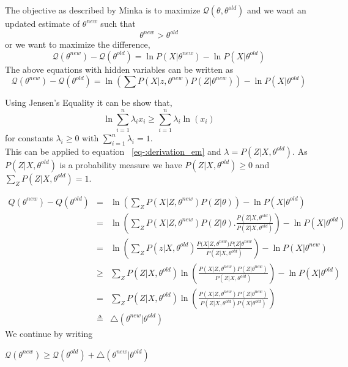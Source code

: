\documentclass[12pt]{dalcsthesis}
\begin{document}
The objective as described by Minka \cite{minka1998expectation} is to maximize $\mathcal{Q}(\theta,\theta^{old})$ and we want an updated estimate of $\theta^{new}$ such that 
\begin{equation}
\theta^{new}>\theta^{old}
\end{equation}
or we want to maximize the difference,
\begin{equation}
\mathcal{Q}(\theta^{new})-\mathcal{Q}(\theta^{old})=\ln P(X|\theta^{new}) - \ln P(X|\theta^{old})
\end{equation}
The above equations with hidden variables can be written as
\begin{equation}
\label{eq-:derivation_em}
\mathcal{Q}(\theta^{new})-\mathcal{Q}(\theta^{old})=\ln(\sum P(X|z,\theta^{new}) P(Z|\theta^{new})) - \ln P(X|\theta^{old})
\end{equation}

Using Jensen's Equality it can be show that,
\begin{equation}
\ln \sum_{i=1}^{n}\lambda_{i}x_{i} \geq \sum_{i=1}^{n}\lambda_{i}\ln(x_{i})
\end{equation}
for constants $\lambda_{i} \geq 0$ with $\sum_{i=1}^{n}\lambda_{i}=1$. 
\\
This can be applied to equation ~\ref{eq-:derivation_em} and $\lambda=P(Z|X,\theta^{old})$. As $P(Z|X,\theta^{old})$ is a probability measure we have $P(Z|X,\theta^{old}) \geq 0$ and $\sum_{Z}P(Z|X,\theta^{old})=1$.

\begin{eqnarray}
Q(\theta^{new})-Q(\theta^{old}) & = & \ln(\sum_{Z}P(X|Z,\theta^{new})P(Z|\theta))-\ln P(X|\theta^{old})\\
 & = & \ln(\sum_{Z}P(X|Z,\theta^{new})P(Z|\theta).\frac{P(Z|X,\theta^{old})}{P(Z|X,\theta^{old})})-\ln P(X|\theta^{old})\\
 & = & \ln(\sum_{Z}P(z|X,\theta^{old})\frac{P(X|Z,\theta^{new})P(Z|\theta^{new}}{P(Z|X,\theta^{old})})-\ln P(X|\theta^{new})\\
 & \geq & \sum_{Z}P(Z|X,\theta^{old})\ln(\frac{P(X|Z,\theta^{new})P(Z|\theta^{new})}{P(Z|X,\theta^{old})})-\ln P(X|\theta^{old})\\
 & = & \sum_{Z}P(Z|X,\theta^{old})\ln(\frac{P(X|Z,\theta^{new})P(Z|\theta^{new})}{P(Z|X,\theta^{old})P(X|\theta^{old})})\\
 & \triangleq & \triangle(\theta^{new}|\theta^{old})
\end{eqnarray}
We continue by writing

$\mathcal{Q}(\theta^{new})\geq\mathcal{Q}(\theta^{old})+\triangle(\theta^{new}|\theta^{old})$
\end{document}
